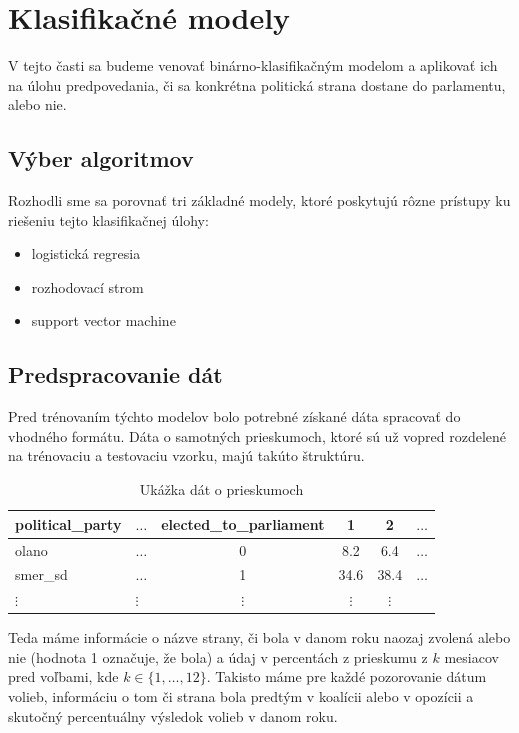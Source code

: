 \documentclass[report.tex]{subfiles}
\begin{document}
	
\section{Klasifikačné modely}	
V tejto časti sa budeme venovať binárno-klasifikačným modelom a aplikovať ich na úlohu predpovedania, či sa konkrétna politická strana dostane do parlamentu, alebo nie.

\subsection{Výber algoritmov}
Rozhodli sme sa porovnať tri základné modely, ktoré poskytujú rôzne prístupy ku riešeniu tejto klasifikačnej úlohy:

\begin{itemize}
    \item logistická regresia
    \item rozhodovací strom
    \item support vector machine
\end{itemize}

\subsection{Predspracovanie dát}
Pred trénovaním týchto modelov bolo potrebné získané dáta spracovať do vhodného formátu. Dáta o samotných prieskumoch, ktoré sú už vopred rozdelené na trénovaciu a testovaciu vzorku, majú takúto štruktúru.

\begin{table}[h!]
    \centering
    \caption{Ukážka dát o prieskumoch}
    \begin{tabular}{llcccl}
        \toprule
        \textbf{political\_party} & \textbf{$\ldots$} & \textbf{elected\_to\_parliament} & \textbf{1} & \textbf{2} & \textbf{$\ldots$} \\
        \midrule
        olano    & $\ldots$ & 0        & 8.2      & 6.4 & $\ldots$ \\
        smer\_sd & $\ldots$ & 1        & 34.6     & 38.4 & $\ldots$ \\
        $\vdots$ & $\vdots$ & $\vdots$ & $\vdots$ & $\vdots$ & \\  
        \bottomrule
    \end{tabular}
\end{table}

Teda máme informácie o názve strany, či bola v danom roku naozaj zvolená alebo nie (hodnota 1 označuje, že bola) a údaj v percentách z prieskumu z $k$ mesiacov pred voľbami, kde $k \in \{ 1, \ldots , 12 \}$. Takisto máme pre každé pozorovanie dátum volieb, informáciu o tom či strana bola predtým v koalícii alebo v opozícii a skutočný percentuálny výsledok volieb v danom roku.
\end{document}
